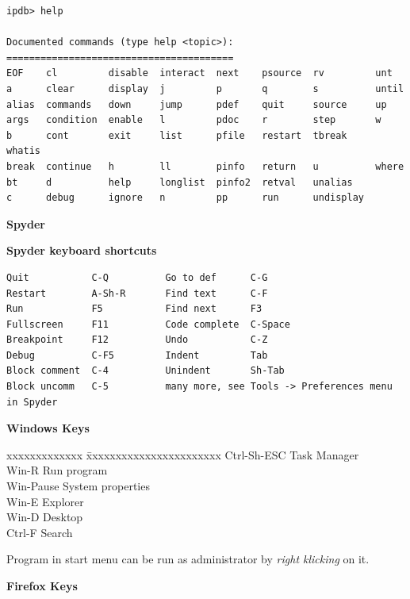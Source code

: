 \documentclass[9pt,a4wide]{extarticle}
\begin{document}
\begin{verbatim}
ipdb> help

Documented commands (type help <topic>):
========================================
EOF    cl         disable  interact  next    psource  rv         unt
a      clear      display  j         p       q        s          until
alias  commands   down     jump      pdef    quit     source     up
args   condition  enable   l         pdoc    r        step       w
b      cont       exit     list      pfile   restart  tbreak     whatis
break  continue   h        ll        pinfo   return   u          where
bt     d          help     longlist  pinfo2  retval   unalias
c      debug      ignore   n         pp      run      undisplay
\end{verbatim}


\medskip
{\bf Spyder}

{\bf Spyder keyboard shortcuts}

\begin{verbatim}
Quit           C-Q          Go to def      C-G
Restart        A-Sh-R       Find text      C-F
Run            F5           Find next      F3
Fullscreen     F11          Code complete  C-Space
Breakpoint     F12          Undo           C-Z
Debug          C-F5         Indent         Tab
Block comment  C-4          Unindent       Sh-Tab
Block uncomm   C-5          many more, see Tools -> Preferences menu in Spyder
\end{verbatim}      


\medskip

{\bf Windows Keys}

\begin{tabbing}
    xxxxxxxxxxxxx \= xxxxxxxxxxxxxxxxxxxxxxx \kill
    Ctrl-Sh-ESC   \> Task Manager \\
    Win-R         \> Run program \\
    Win-Pause     \> System properties \\
    Win-E         \> Explorer \\
    Win-D         \> Desktop  \\
    Ctrl-F        \> Search  \\
\end{tabbing}

Program in start menu can be run as administrator by {\em right klicking} on 
it.

\medskip

{\bf Firefox Keys}
\end{document}
